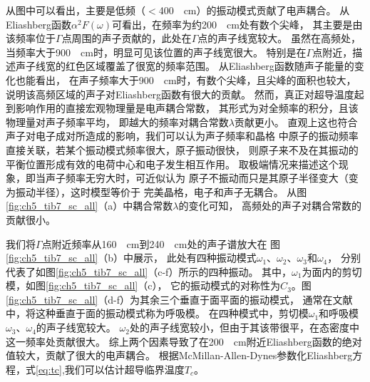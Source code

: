 从图中可以看出，主要是低频（$<$\SI{400}{\per\cm}）的振动模式贡献了电声耦合。
从Eliashberg函数$\alpha^2 F(\omega)$可看出，在频率为约\SI{200}{\per\cm}处有数个尖峰，
其主要是由该频率位于$\Gamma$点周围的声子贡献的，此处在$\Gamma$点的声子线宽较大。
虽然在高频处，当频率大于\SI{900}{\per\cm}时，明显可见该位置的声子线宽很大。
特别是在$\Gamma$点附近，描述声子线宽的红色区域覆盖了很宽的频率范围。
从Eliashberg函数随声子能量的变化也能看出，
在声子频率大于\SI{900}{\per\cm}时，有数个尖峰，且尖峰的面积也较大，
说明该高频区域的声子对Eliashberg函数有很大的贡献。
然而，真正对超导温度起到影响作用的直接宏观物理量是电声耦合常数，
其形式为对全频率的积分，且该物理量对声子频率平均，
即越大的频率对耦合常数$\lambda$贡献更小。
直观上这也符合声子对电子成对所造成的影响，我们可以认为声子频率和晶格
中原子的振动频率直接关联，若某个振动模式频率很大，原子振动很快，
则原子来不及在其振动的平衡位置形成有效的电荷中心和电子发生相互作用。
取极端情况来描述这个现象，即当声子频率无穷大时，可近似认为
原子不振动而只是其原子半径变大（变为振动半径），这时模型等价于
完美晶格，电子和声子无耦合。
从图\ref{fig:ch5_tib7_sc_all}（a）中耦合常数$\lambda$的变化可知，
高频处的声子对耦合常数的贡献很小。

我们将$\Gamma$点附近频率从\SI{160}{\per\cm}到\SI{240}{\per\cm}处的声子谱放大在
图\ref{fig:ch5_tib7_sc_all}（b）中展示，
此处有四种振动模式$\omega_1$、$\omega_2$、$\omega_3$和$\omega_4$，
分别代表了如图\ref{fig:ch5_tib7_sc_all}（c-f）所示的四种振动。
其中，$\omega_1$为面内的剪切模，如图\ref{fig:ch5_tib7_sc_all}（c），
它的振动模式的对称性为$C_3$。图\ref{fig:ch5_tib7_sc_all}（d-f）为其余三个垂直于面平面的振动模式，
通常在文献中，将这种垂直于面的振动模式称为呼吸模。
在四种模式中，剪切模$\omega_1$和呼吸模$\omega_3$、$\omega_4$的声子线宽较大。
$\omega_2$处的声子线宽较小，但由于其该带很平，在态密度中这一频率处贡献很大。
综上两个因素导致了在\SI{200}{\per\cm}附近Eliashberg函数的绝对值较大，贡献了很大的电声耦合。
根据McMillan-Allen-Dynes参数化Eliashberg方程，式\ref{eq:tc},我们可以估计超导临界温度$T_c$。

